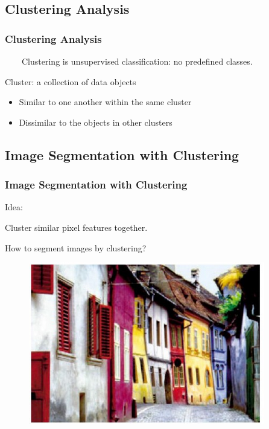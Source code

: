 \documentclass[notheorems,serif,table,compress]{beamer}  %
\begin{document}

\subsection{Clustering Analysis}
\begin{frame}[fragile]
\frametitle{Clustering Analysis}
    ~~~~Clustering is {\color{blue}unsupervised classification}: no predefined classes.\newline
    
{\color{blue}Cluster:} a collection of data objects
    \begin{itemize}
      \item Similar to one another within the same cluster 
      \item Dissimilar to the objects in other clusters
    \end{itemize}
\end{frame}

\subsection{Image Segmentation with Clustering}
\begin{frame}
\frametitle{Image Segmentation with Clustering}
{\color{blue}Idea:}

Cluster similar pixel features together.\newline

{\color{blue}How to segment images by clustering?}
    \begin{figure}
      \includegraphics[width=0.6\linewidth]{clustering1.png}
    \end{figure}
\end{frame}
\end{document}
